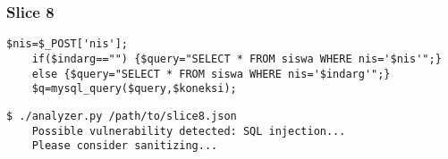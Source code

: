 \subsubsection*{Slice 8}
\label{sec:experimental.example.slice08}

\begin{lstlisting}[label={php.slice08},
        title={slice8.php}]
    $nis=$_POST['nis'];
    if($indarg=="") {$query="SELECT * FROM siswa WHERE nis='$nis'";}
    else {$query="SELECT * FROM siswa WHERE nis='$indarg'";}
    $q=mysql_query($query,$koneksi);
\end{lstlisting}

\begin{lstlisting}[label={out.example.slice08},
        caption={Shortened example SQLI vulnerable slice analysis output}]
    $ ./analyzer.py /path/to/slice8.json
    Possible vulnerability detected: SQL injection...
    Please consider sanitizing...
\end{lstlisting}
